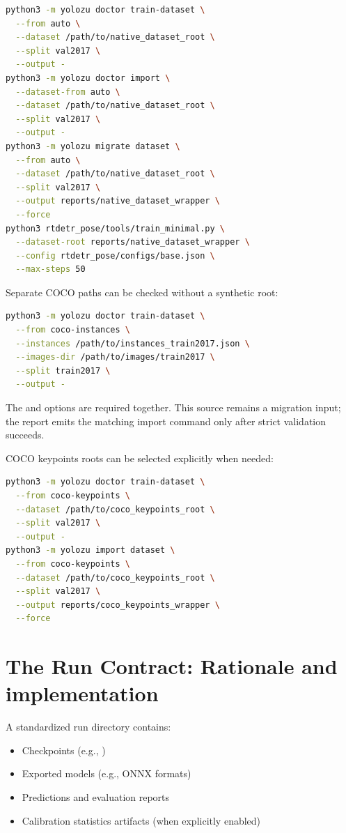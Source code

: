 \begin{lstlisting}[language=bash]
python3 -m yolozu doctor train-dataset \
  --from auto \
  --dataset /path/to/native_dataset_root \
  --split val2017 \
  --output -
python3 -m yolozu doctor import \
  --dataset-from auto \
  --dataset /path/to/native_dataset_root \
  --split val2017 \
  --output -
python3 -m yolozu migrate dataset \
  --from auto \
  --dataset /path/to/native_dataset_root \
  --split val2017 \
  --output reports/native_dataset_wrapper \
  --force
python3 rtdetr_pose/tools/train_minimal.py \
  --dataset-root reports/native_dataset_wrapper \
  --config rtdetr_pose/configs/base.json \
  --max-steps 50
\end{lstlisting}

Separate COCO paths can be checked without a synthetic root:
\begin{lstlisting}[language=bash]
python3 -m yolozu doctor train-dataset \
  --from coco-instances \
  --instances /path/to/instances_train2017.json \
  --images-dir /path/to/images/train2017 \
  --split train2017 \
  --output -
\end{lstlisting}
The \cmd{--instances} and  options are required together. This source remains a migration input; the report emits the matching import command only after strict validation succeeds.

\clearpage
COCO keypoints roots can be selected explicitly when needed:
\begin{lstlisting}[language=bash]
python3 -m yolozu doctor train-dataset \
  --from coco-keypoints \
  --dataset /path/to/coco_keypoints_root \
  --split val2017 \
  --output -
python3 -m yolozu import dataset \
  --from coco-keypoints \
  --dataset /path/to/coco_keypoints_root \
  --split val2017 \
  --output reports/coco_keypoints_wrapper \
  --force
\end{lstlisting}

\section{The Run Contract: Rationale and implementation}
A standardized run directory contains:
\begin{itemize}
  \item Checkpoints (e.g., )
  \item Exported models (e.g., ONNX formats)
  \item Predictions and evaluation reports
  \item Calibration statistics artifacts (when explicitly enabled)
\end{itemize}

